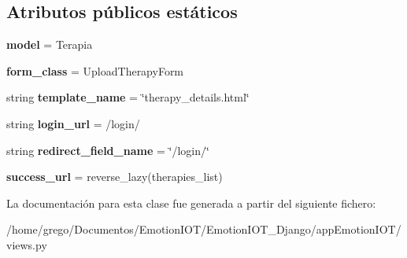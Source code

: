 \subsection*{Atributos públicos estáticos}
\begin{DoxyCompactItemize}
\item 
{\bfseries model} = Terapia\hypertarget{classappEmotionIOT_1_1views_1_1Update__therapy_ac0a9c880ee500b5192a98823c14e0fb2}{}\label{classappEmotionIOT_1_1views_1_1Update__therapy_ac0a9c880ee500b5192a98823c14e0fb2}

\item 
{\bfseries form\+\_\+class} = Upload\+Therapy\+Form\hypertarget{classappEmotionIOT_1_1views_1_1Update__therapy_a8b3ea31ef379d271ac51a7ec2a63e32e}{}\label{classappEmotionIOT_1_1views_1_1Update__therapy_a8b3ea31ef379d271ac51a7ec2a63e32e}

\item 
string {\bfseries template\+\_\+name} = \char`\"{}therapy\+\_\+details.\+html\char`\"{}\hypertarget{classappEmotionIOT_1_1views_1_1Update__therapy_a7ccaab9c9d9aa9c7bc390a156e733c7e}{}\label{classappEmotionIOT_1_1views_1_1Update__therapy_a7ccaab9c9d9aa9c7bc390a156e733c7e}

\item 
string {\bfseries login\+\_\+url} = \textquotesingle{}/login/\textquotesingle{}\hypertarget{classappEmotionIOT_1_1views_1_1Update__therapy_abbeb626018dcd4fde2880d2bec231b75}{}\label{classappEmotionIOT_1_1views_1_1Update__therapy_abbeb626018dcd4fde2880d2bec231b75}

\item 
string {\bfseries redirect\+\_\+field\+\_\+name} = \char`\"{}/login/\char`\"{}\hypertarget{classappEmotionIOT_1_1views_1_1Update__therapy_a14cc748d951a67a1d13a1284f1777444}{}\label{classappEmotionIOT_1_1views_1_1Update__therapy_a14cc748d951a67a1d13a1284f1777444}

\item 
{\bfseries success\+\_\+url} = reverse\+\_\+lazy(\textquotesingle{}therapies\+\_\+list\textquotesingle{})\hypertarget{classappEmotionIOT_1_1views_1_1Update__therapy_a67057ba098641d2c3d8b7c3bcf5fd613}{}\label{classappEmotionIOT_1_1views_1_1Update__therapy_a67057ba098641d2c3d8b7c3bcf5fd613}

\end{DoxyCompactItemize}


La documentación para esta clase fue generada a partir del siguiente fichero\+:\begin{DoxyCompactItemize}
\item 
/home/grego/\+Documentos/\+Emotion\+I\+O\+T/\+Emotion\+I\+O\+T\+\_\+\+Django/app\+Emotion\+I\+O\+T/views.\+py\end{DoxyCompactItemize}
